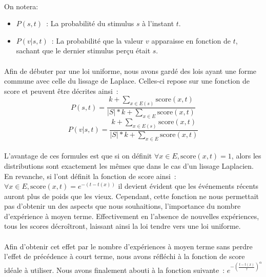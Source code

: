 \paragraph{}
On notera:
\begin{itemize}
\item $P(s, t)$~: La probabilité du stimulus $s$ à l'instant $t$.
\item $P(v|s, t)$~: La probabilité que la valeur $v$ apparaisse en fonction
      de $t$, sachant que le dernier stimulus perçu était $s$.
\end{itemize}
\paragraph{}
Afin de débuter par une loi uniforme, nous avons gardé des lois ayant une
forme commune avec celle du lissage de Laplace. Celles-ci repose sur une
fonction de score et peuvent être décrites ainsi~:
$$P(s,t) = \frac{k + \sum\limits_{x \in E(s)} \mathrm{score}(x, t)}
                {|S| * k + \sum\limits_{x \in E} \mathrm{score}(x, t)}$$
$$P(v| s, t) = \frac{k + \sum\limits_{x \in E(s)} \mathrm{score}(x, t)}
                {|S| * k + \sum\limits_{x \in E} \mathrm{score}(x, t)}$$

\paragraph{}
L'avantage de ces formules est que si on définit
$\forall x \in E, \mathrm{score}(x, t) = 1$, alors les distributions sont
exactement les mêmes que dans le cas d'un lissage Laplacien. En revanche, si
l'ont définit la fonction de score ainsi~:
$\forall x \in E, \mathrm{score}(x, t) = e^{-(t - t(x))}$ il devient évident que
les événements récents auront plus de poids que les vieux. Cependant, cette
fonction ne nous permettait pas d'obtenir un des aspects que nous souhaitions,
l'importance du nombre d'expérience à moyen terme. Effectivement en l'absence
de nouvelles expériences, tous les scores décroîtront, laissant ainsi la loi
tendre vers une loi uniforme.

\paragraph{}
Afin d'obtenir cet effet par le nombre d'expériences à moyen terme sans perdre
l'effet de précédence à court terme, nous avons réfléchi à la fonction de
score idéale à utiliser. Nous avons finalement abouti à la fonction suivante~:
$e^{-(\frac{t-t(x)}{\tau})^{\alpha}}$

